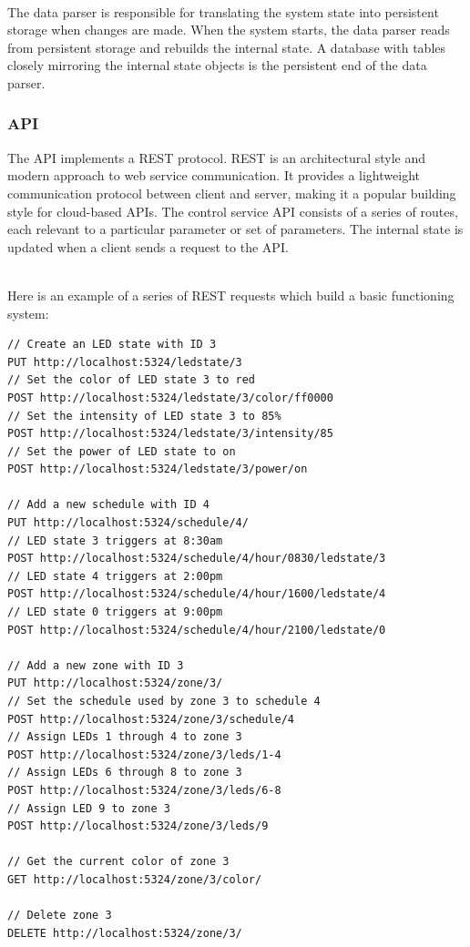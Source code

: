 			\noindent \\The data parser is responsible for translating the system state into persistent storage when changes are made.
			When the system starts, the data parser reads from persistent storage and rebuilds the internal state.
			A database with tables closely mirroring the internal state objects is the persistent end of the data parser.

			\subsubsection{API}
			The API implements a REST protocol. REST is an architectural style and modern approach to web service communication. \cite{rest1}
			It provides a lightweight communication protocol between client and server, making it a popular building style for cloud-based APIs.
			The control service API consists of a series of routes, each relevant to a particular parameter or set of parameters.
			The internal state is updated when a client sends a request to the API.

			\noindent \\Here is an example of a series of REST requests which build a basic functioning system:
			\begin{lstlisting}[language=XML]
// Create an LED state with ID 3
PUT http://localhost:5324/ledstate/3
// Set the color of LED state 3 to red
POST http://localhost:5324/ledstate/3/color/ff0000
// Set the intensity of LED state 3 to 85%
POST http://localhost:5324/ledstate/3/intensity/85
// Set the power of LED state to on
POST http://localhost:5324/ledstate/3/power/on

// Add a new schedule with ID 4
PUT http://localhost:5324/schedule/4/
// LED state 3 triggers at 8:30am
POST http://localhost:5324/schedule/4/hour/0830/ledstate/3
// LED state 4 triggers at 2:00pm
POST http://localhost:5324/schedule/4/hour/1600/ledstate/4
// LED state 0 triggers at 9:00pm
POST http://localhost:5324/schedule/4/hour/2100/ledstate/0

// Add a new zone with ID 3
PUT http://localhost:5324/zone/3/
// Set the schedule used by zone 3 to schedule 4
POST http://localhost:5324/zone/3/schedule/4
// Assign LEDs 1 through 4 to zone 3
POST http://localhost:5324/zone/3/leds/1-4
// Assign LEDs 6 through 8 to zone 3
POST http://localhost:5324/zone/3/leds/6-8
// Assign LED 9 to zone 3
POST http://localhost:5324/zone/3/leds/9

// Get the current color of zone 3
GET http://localhost:5324/zone/3/color/

// Delete zone 3
DELETE http://localhost:5324/zone/3/
\end{lstlisting}

